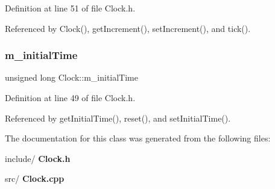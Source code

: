 Definition at line 51 of file Clock.\+h.



Referenced by Clock(), get\+Increment(), set\+Increment(), and tick().

\mbox{\label{class_clock_a71afbea0f41f612e36d45ee2bb79ff0e}} 
\subsubsection{m\+\_\+initial\+Time}
{\footnotesize\ttfamily unsigned long Clock\+::m\+\_\+initial\+Time\hspace{0.3cm}{\ttfamily [private]}}



Definition at line 49 of file Clock.\+h.



Referenced by get\+Initial\+Time(), reset(), and set\+Initial\+Time().



The documentation for this class was generated from the following files\+:\begin{DoxyCompactItemize}
\item 
include/\textbf{ Clock.\+h}\item 
src/\textbf{ Clock.\+cpp}\end{DoxyCompactItemize}
